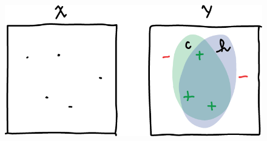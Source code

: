 \documentclass[
10pt, %
a4paper, %
onecolumn, %
]{article}
\begin{document}
  
\begin{figure}[!htp]
    \centering
    \includegraphics[width=.8\textwidth]{conceptVShypothesis}
    \label{conceptVShypothesis}
\end{figure}

%
%

\renewcommand{\refname}{References} %


\end{document}
